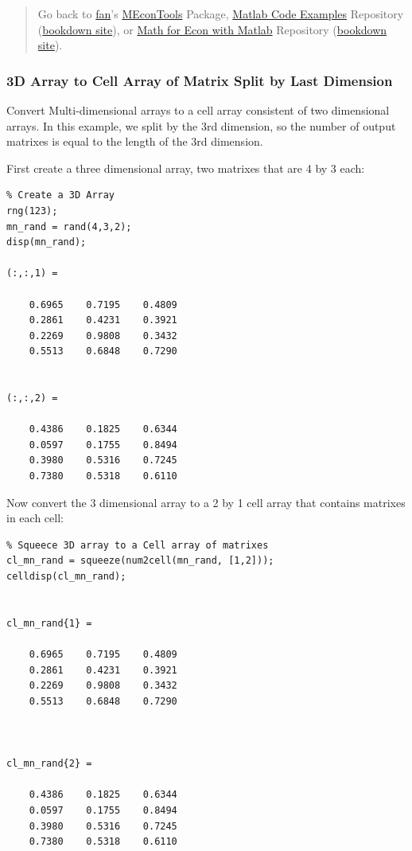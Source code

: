 \documentclass[
]{book}
\begin{document}
\begin{quote}
Go back to \href{http://fanwangecon.github.io/}{fan}'s \href{https://fanwangecon.github.io/MEconTools/}{MEconTools} Package, \href{https://fanwangecon.github.io/M4Econ/}{Matlab Code Examples} Repository (\href{https://fanwangecon.github.io/M4Econ/bookdown}{bookdown site}), or \href{https://fanwangecon.github.io/Math4Econ/}{Math for Econ with Matlab} Repository (\href{https://fanwangecon.github.io/Math4Econ/bookdown}{bookdown site}).
\end{quote}

\hypertarget{d-array-to-cell-array-of-matrix-split-by-last-dimension}{%
\subsubsection{3D Array to Cell Array of Matrix Split by Last Dimension}\label{d-array-to-cell-array-of-matrix-split-by-last-dimension}}

Convert Multi-dimensional arrays to a cell array consistent of two
dimensional arrays. In this example, we split by the 3rd dimension, so
the number of output matrixes is equal to the length of the 3rd
dimension.

First create a three dimensional array, two matrixes that are 4 by 3
each:

\begin{verbatim}
% Create a 3D Array
rng(123);
mn_rand = rand(4,3,2);
disp(mn_rand);

(:,:,1) =

    0.6965    0.7195    0.4809
    0.2861    0.4231    0.3921
    0.2269    0.9808    0.3432
    0.5513    0.6848    0.7290


(:,:,2) =

    0.4386    0.1825    0.6344
    0.0597    0.1755    0.8494
    0.3980    0.5316    0.7245
    0.7380    0.5318    0.6110
\end{verbatim}

Now convert the 3 dimensional array to a 2 by 1 cell array that contains
matrixes in each cell:

\begin{verbatim}
% Squeece 3D array to a Cell array of matrixes
cl_mn_rand = squeeze(num2cell(mn_rand, [1,2]));
celldisp(cl_mn_rand);


cl_mn_rand{1} =
 
    0.6965    0.7195    0.4809
    0.2861    0.4231    0.3921
    0.2269    0.9808    0.3432
    0.5513    0.6848    0.7290



cl_mn_rand{2} =
 
    0.4386    0.1825    0.6344
    0.0597    0.1755    0.8494
    0.3980    0.5316    0.7245
    0.7380    0.5318    0.6110
\end{verbatim}
\end{document}
